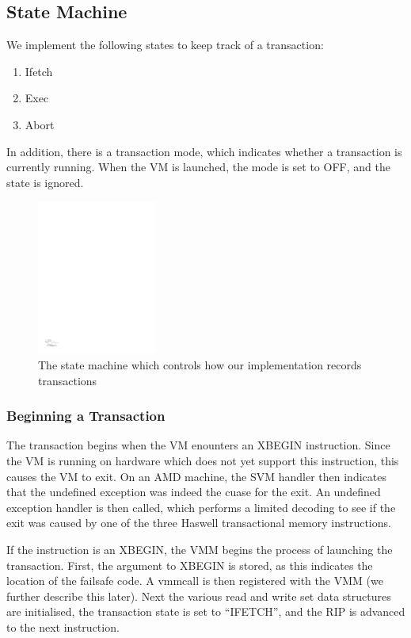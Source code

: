 \documentclass{acm_proc_article-sp}
\begin{document}
\subsection{State Machine}

We implement the following states to keep track of a transaction: 
\begin{enumerate}
\item Ifetch
\item Exec
\item Abort 
\end{enumerate}

In addition, there is a transaction mode, which indicates whether a transaction
is currently running. When the VM is launched, the mode is set to OFF, and the
state is ignored.

\begin{figure}[t]
\centering
\includegraphics[height=2.0in]{figs/fsm.pdf}
\caption{The state machine which controls how our implementation records 
transactions}
\label{flowchart}
\end{figure}
\subsubsection{Beginning a Transaction}

The transaction begins when the VM enounters an XBEGIN instruction. Since the 
VM is running on hardware which does not yet support this instruction, this
causes the VM to exit. On an AMD machine, the SVM handler then indicates that
the undefined exception was indeed the cuase for the exit. An undefined 
exception handler is then called, which performs a limited decoding to see
if the exit was caused by one of the three Haswell transactional memory
instructions.    

If the instruction is an XBEGIN, the VMM begins the process of launching the
transaction. First, the argument to XBEGIN is stored, as this indicates the 
location of the failsafe code. A vmmcall is then registered with the VMM
(we further describe this later). Next the various read and write set data
structures are initialised, the transaction state is set to ``IFETCH'', and the
RIP is advanced to the next instruction.
\end{document}
